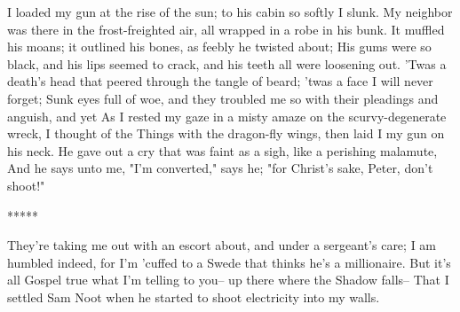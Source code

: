 \begin{poemblock}
 I loaded my gun at the rise of the sun; to his cabin so softly I slunk.
 My neighbor was there in the frost-freighted air,
   all wrapped in a robe in his bunk.
 It muffled his moans; it outlined his bones, as feebly he twisted about;
 His gums were so black, and his lips seemed to crack,
   and his teeth all were loosening out.
 'Twas a death's head that peered through the tangle of beard;
   'twas a face I will never forget;
 Sunk eyes full of woe, and they troubled me so
   with their pleadings and anguish, and yet
 As I rested my gaze in a misty amaze on the scurvy-degenerate wreck,
 I thought of the Things with the dragon-fly wings,
   then laid I my gun on his neck.
 He gave out a cry that was faint as a sigh, like a perishing malamute,
 And he says unto me, "I'm converted," says he;
   "for Christ's sake, Peter, don't shoot!"

  *****

 They're taking me out with an escort about, and under a sergeant's care;
 I am humbled indeed, for I'm 'cuffed to a Swede
   that thinks he's a millionaire.
 But it's all Gospel true what I'm telling to you--
   up there where the Shadow falls--
 That I settled Sam Noot when he started to shoot electricity into my walls.
\end{poemblock}
